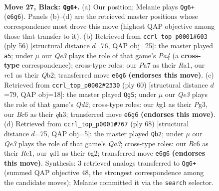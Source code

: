 \documentclass[11pt]{article}
\begin{document}
\clearpage

\begin{figure}[p]\centering
\begin{subfigure}{0.46\textwidth}\centering
\resizebox{\linewidth}{!}{%
\newchessgame
\chessboard[
  setfen={5rk1/p4pb1/2bpq3/7p/P6P/4p3/5r2/2RQ2KR b - - 1 27},
  showmover=false,
  pgfstyle=straightmove, color=movearrow, markmove={e6-g6}
]}
\caption{}
\end{subfigure}\hfill
\begin{subfigure}{0.46\textwidth}\centering
\resizebox{\linewidth}{!}{%
\newchessgame
\chessboard[
  setfen={3qr2k/R6p/1p2b1p1/8/P2pP3/1PrP4/1Q4BP/R6K w - - 1 29},
  showmover=false,
  pgfstyle=straightmove, color=movearrow, markmove={a4-a5}
]}
\caption{}
\end{subfigure}
\\[4pt]
\begin{subfigure}{0.46\textwidth}\centering
\resizebox{\linewidth}{!}{%
\newchessgame
\chessboard[
  setfen={1r3k2/5pp1/p7/3PR3/7r/2P2KPq/PP1Q1R2/8 w - - 3 31},
  showmover=false,
  pgfstyle=straightmove, color=movearrow, markmove={d2-g5}
]}
\caption{}
\end{subfigure}\hfill
\begin{subfigure}{0.46\textwidth}\centering
\resizebox{\linewidth}{!}{%
\newchessgame
\chessboard[
  setfen={2r1r1k1/2q4p/5pp1/p7/2PP4/Q1KB4/P5bP/2R1R3 w - - 2 35},
  showmover=false,
  pgfstyle=straightmove, color=movearrow, markmove={a3-b2}
]}
\caption{}
\end{subfigure}
\caption{\textbf{Move 27, Black: \texttt{Qg6+}.} (a) Our position; Melanie plays \texttt{Qg6+} (\texttt{e6g6}). Panels (b)--(d) are the retrieved master positions whose correspondence most drove this move (highest QAP objective among those that transfer to it). (b) Retrieved from \texttt{ccrl\_top\_p0001\#603} (ply 56) [structural distance $d$=76, QAP obj=25]: the master played \texttt{a5}; under $\mu$ our \emph{Qe3} plays the role of that game's \emph{Pa4} (a \textbf{cross-type} correspondence); cross-type roles: our \emph{P}a7 as their \emph{R}a1, our \emph{r}c1 as their \emph{Q}b2; transferred move \texttt{e6g6} \textbf{(endorses this move)}. (c) Retrieved from \texttt{ccrl\_top\_p0002\#2330} (ply 60) [structural distance $d$=79, QAP obj=18]: the master played \texttt{Qg5}; under $\mu$ our \emph{Qe3} plays the role of that game's \emph{Qd2}; cross-type roles: our \emph{k}g1 as their \emph{P}g3, our \emph{B}c6 as their \emph{q}h3; transferred move \texttt{e6g6} \textbf{(endorses this move)}. (d) Retrieved from \texttt{ccrl\_top\_p0001\#767} (ply 68) [structural distance $d$=75, QAP obj=5]: the master played \texttt{Qb2}; under $\mu$ our \emph{Qe3} plays the role of that game's \emph{Qa3}; cross-type roles: our \emph{B}c6 as their \emph{R}e1, our \emph{q}d1 as their \emph{b}g2; transferred move \texttt{e6g6} \textbf{(endorses this move)}. Synthesis: 3 retrieved analogs transferred to \texttt{Qg6+} (summed QAP objective 48, the strongest correspondence among the candidate moves); Melanie committed it via the \texttt{search} selector.}
\label{fig:thought-m53}
\end{figure}
\end{document}
